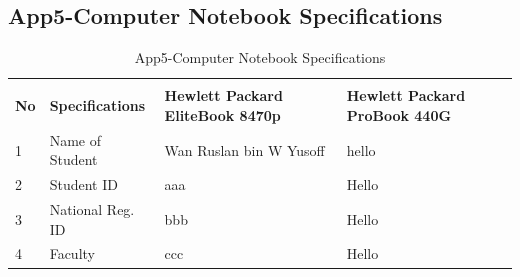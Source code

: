 \clearpage
\begin{landscape}
\subsection{App5-Computer Notebook Specifications}
	
\begin{table}[ht]
\begin{center}
\caption{App5-Computer Notebook Specifications}		
\label{table:App5-Computer Notebook Specifications}	
	
\begin{tabular}{ |p{0.5cm}|p{5.0cm}|p{9.0cm}|p{9.0cm}|}
	\rowcolor{gray!10}			
	\hline \multicolumn{4}{|c|}{\textbf{Computer Notebook Specifications}} \\ [1.0ex]
	\rowcolor{gray!10}
	\hline \textbf{No} & \textbf{Specifications}    & \textbf{Hewlett Packard EliteBook 8470p} & \textbf{Hewlett Packard ProBook 440G}\\ 

	\hline 1 & Name of Student    & Wan Ruslan bin W Yusoff & hello\\ 
	\hline 2 & Student ID         &  aaa & Hello\\ 
	\hline 3 & National Reg. ID   & bbb  & Hello\\ 
	\hline 4 & Faculty            & ccc  & Hello\\ 

	\hline
\end{tabular}
\end{center}
\end{table}  
	
	
\end{landscape}
\clearpage
